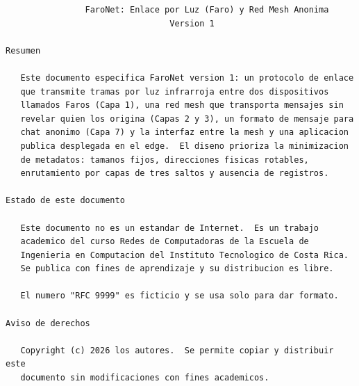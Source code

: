 \begin{Verbatim}
                FaroNet: Enlace por Luz (Faro) y Red Mesh Anonima
                                 Version 1

Resumen

   Este documento especifica FaroNet version 1: un protocolo de enlace
   que transmite tramas por luz infrarroja entre dos dispositivos
   llamados Faros (Capa 1), una red mesh que transporta mensajes sin
   revelar quien los origina (Capas 2 y 3), un formato de mensaje para
   chat anonimo (Capa 7) y la interfaz entre la mesh y una aplicacion
   publica desplegada en el edge.  El diseno prioriza la minimizacion
   de metadatos: tamanos fijos, direcciones fisicas rotables,
   enrutamiento por capas de tres saltos y ausencia de registros.

Estado de este documento

   Este documento no es un estandar de Internet.  Es un trabajo
   academico del curso Redes de Computadoras de la Escuela de
   Ingenieria en Computacion del Instituto Tecnologico de Costa Rica.
   Se publica con fines de aprendizaje y su distribucion es libre.

   El numero "RFC 9999" es ficticio y se usa solo para dar formato.

Aviso de derechos

   Copyright (c) 2026 los autores.  Se permite copiar y distribuir este
   documento sin modificaciones con fines academicos.
\end{Verbatim}
\newpage
